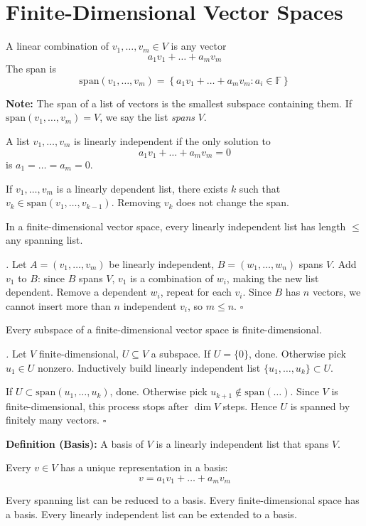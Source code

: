 \documentclass[11pt]{article}
\renewenvironment{proof}[1][\proofname]{\par\noindent\textit{#1.} }{\hfill$\square$\par}
\begin{document}
\section{Finite-Dimensional Vector Spaces}

A linear combination of $v_1, \dots, v_m \in V$ is any vector
\[
  a_1v_1 + \dots + a_mv_m
\]
The span is
\[
  \text{span}(v_1, \dots, v_m) = \left\{ a_1v_1 + \dots + a_mv_m : a_i \in \mathbb{F} \right\}
\]

\textbf{Note:} The span of a list of vectors is the smallest subspace containing them. If $\text{span}(v_1, \dots, v_m) = V$, we say the list \textit{spans} $V$.

A list $v_1, \dots, v_m$ is linearly independent if the only solution to
\[
  a_1v_1 + \dots + a_mv_m = 0
\]
is $a_1 = \dots = a_m = 0$.

\begin{lemma}
If $v_1, \dots, v_m$ is a linearly dependent list, there exists $k$ such that $v_k \in \text{span}(v_1, \dots, v_{k-1})$. Removing $v_k$ does not change the span.
\end{lemma}

\begin{theorem}
In a finite-dimensional vector space, every linearly independent list has length $\leq$ any spanning list.
\end{theorem}
\begin{proof}
Let $A = (v_1, \dots, v_m)$ be linearly independent, $B = (w_1, \dots, w_n)$ spans $V$. Add $v_1$ to $B$: since $B$ spans $V$, $v_1$ is a combination of $w_i$, making the new list dependent. Remove a dependent $w_i$, repeat for each $v_i$. Since $B$ has $n$ vectors, we cannot insert more than $n$ independent $v_i$, so $m \leq n$.
\end{proof}

\begin{theorem}
Every subspace of a finite-dimensional vector space is finite-dimensional.
\end{theorem}
\begin{proof}
Let $V$ finite-dimensional, $U \subseteq V$ a subspace. If $U = \{0\}$, done. Otherwise pick $u_1 \in U$ nonzero. Inductively build linearly independent list $\{u_1, \dots, u_k\} \subset U$.

If $U \subset \text{span}(u_1, \dots, u_k)$, done. Otherwise pick $u_{k+1} \notin \text{span}(\dots)$. Since $V$ is finite-dimensional, this process stops after $\dim V$ steps. Hence $U$ is spanned by finitely many vectors.
\end{proof}

\textbf{Definition (Basis):} A basis of $V$ is a linearly independent list that spans $V$.

Every $v \in V$ has a unique representation in a basis:
\[
  v = a_1v_1 + \dots + a_mv_m
\]

Every spanning list can be reduced to a basis. Every finite-dimensional space has a basis. Every linearly independent list can be extended to a basis.
\end{document}
